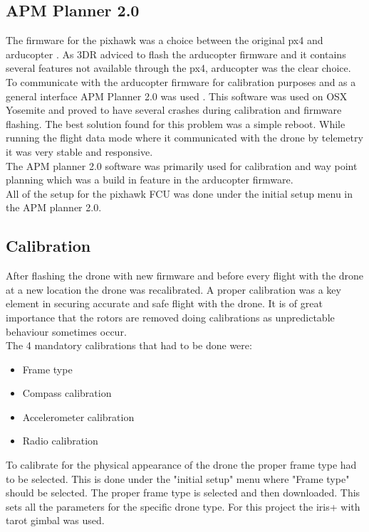 \subsection*{APM Planner 2.0}
The firmware for the pixhawk was a choice between the original px4 and arducopter
\cite{Ref:Arducopter}. As 3DR adviced to flash the arducopter firmware and it contains several
features not available through the px4, arducopter was the clear choice.\\
To communicate with the arducopter firmware for calibration purposes and as a general interface APM
Planner 2.0 was used \cite{Ref:APM2}. This software was used on OSX Yosemite and proved to have
several crashes during calibration and firmware flashing. The best solution found for this problem
was a simple reboot. While running the flight data mode where it communicated with the drone by
telemetry it was very stable and responsive.\\
The APM planner 2.0 software was primarily used for calibration and way point planning which was a
build in feature in the arducopter firmware.\\
All of the setup for the pixhawk FCU was done under the initial setup menu in the APM planner 2.0.

\subsection*{Calibration}

After flashing the drone with new firmware and before every flight with the drone at a new location
the drone was recalibrated. A proper calibration was a key element in securing accurate and safe
flight with the drone. It is of great importance that the rotors are removed doing calibrations as
unpredictable behaviour sometimes occur.\\
The 4 mandatory calibrations that had to be done were:
\begin{itemize}
\item Frame type
\item Compass calibration
\item Accelerometer calibration
\item Radio calibration
\end{itemize}

To calibrate for the physical appearance of the drone the proper frame type had to be selected. This
is done under the "initial setup" menu where "Frame type" should be selected. The proper frame type
is selected and then downloaded. This sets all the parameters for the specific drone type. For this
project the iris+ with tarot gimbal was used.\\

